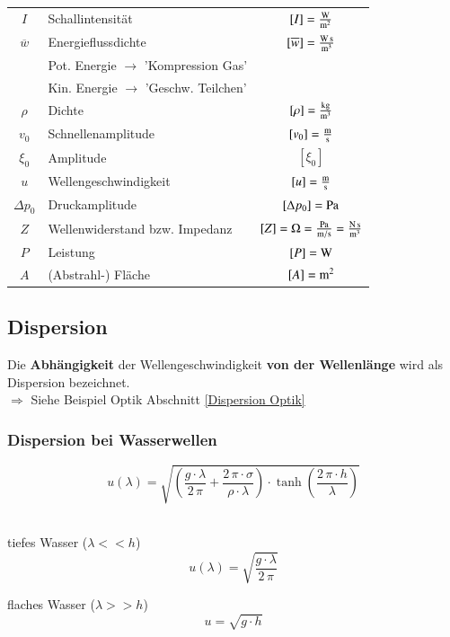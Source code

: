 \renewcommand{\arraystretch}{1.1}
\begin{tabular}{clc}
$I$ &  Schallintensität & $[I] = \frac{\mathrm{W}}{\mathrm{m}^2}$ \\
$\overline{w}$ & Energieflussdichte & $[\overline{w}] = \frac{\mathrm{W} \, \mathrm{s}}{\mathrm{m}^3}$ \\
 & Pot. Energie $\rightarrow$ 'Kompression Gas'& \\
 & Kin. Energie $\rightarrow$ 'Geschw. Teilchen'& \\
$\rho$ & Dichte & $[\rho] = \frac{\mathrm{kg}}{\mathrm{m}^3}$ \\
$v_0$ & Schnellenamplitude & $[v_0] = \frac{\mathrm{m}}{\mathrm{s}}$ \\
$\xi_0$ & Amplitude & $[\xi_0]$ \\
$u$ & Wellengeschwindigkeit & $[u] = \frac{\mathrm{m}}{\mathrm{s}}$ \\
$\Delta p_0$ & Druckamplitude & $[\Delta p_0] = \mathrm{Pa}$ \\
$Z$ & Wellenwiderstand bzw. Impedanz & $[Z] = \mathrm{\Omega} = \frac{\mathrm{Pa}}{\mathrm{m} / \mathrm{s}} = \frac{\mathrm{N} \, \mathrm{s}}{\mathrm{m}^3}$ \\
$P$ & Leistung & $[P] = \mathrm{W}$ \\
$A$ & (Abstrahl-) Fläche & $[A] = \mathrm{m}^2$ 
\end{tabular}
\renewcommand{\arraystretch}{1}



\subsection{Dispersion}
Die \textbf{Abhängigkeit} der Wellengeschwindigkeit \textbf{von der Wellenlänge} wird als Dispersion bezeichnet. \\
\vspace{0.2cm}
$\Rightarrow$ Siehe Beispiel Optik Abschnitt \ref{Dispersion Optik}

\subsubsection{Dispersion bei Wasserwellen}

$$ \boxed{ u(\lambda) = \sqrt{\left( \frac{g \cdot \lambda}{2 \, \pi} + \frac{2 \, \pi \cdot \sigma}{\rho \cdot 
\lambda} \right) \cdot \tanh \left( \frac{2 \, \pi \cdot h}{\lambda} \right) }  } $$ \\


\begin{minipage}{0.48\linewidth}
tiefes Wasser ($\lambda << h$)
$$ \boxed{ u(\lambda) = \sqrt{\frac{g \cdot \lambda}{2 \, \pi}} } $$
\end{minipage}
\hfill
\begin{minipage}{0.48\linewidth}
flaches Wasser ($\lambda >> h$)
$$ \boxed{ u = \sqrt{ g \cdot h } } $$
\end{minipage}

